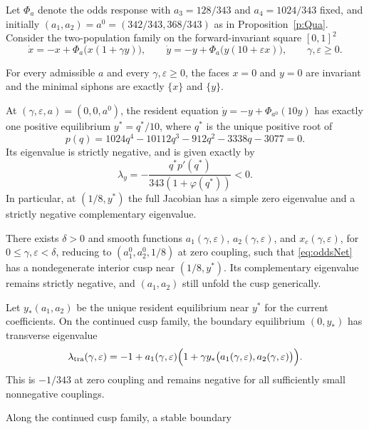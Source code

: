 Let $\Phi_a$ denote the odds response with $a_3=128/343$ and
$a_4=1024/343$ fixed, and initially
$(a_1,a_2)=a^0=(342/343,368/343)$ as in
Proposition~\ref{p:Qua}. Consider the two-population family on
the forward-invariant square $[0,1]^2$
\begin{equation}\label{eq:oddsNet}
 \dot x=-x+\Phi_a\bigl(x(1+\gamma y)\bigr),\qquad
 \dot y=-y+\Phi_a\bigl(y(10+\varepsilon x)\bigr),
 \qquad \gamma,\varepsilon\ge0.
\end{equation}
\BEN
\item For every admissible $a$ and every $\gamma,\varepsilon\ge0$,
 the faces $x=0$ and $y=0$ are invariant and the minimal siphons
 are exactly $\{x\}$ and $\{y\}$.
\item At $(\gamma,\varepsilon,a)=(0,0,a^0)$, the resident equation
 $\dot y=-y+\Phi_{a^0}(10y)$ has exactly one positive equilibrium
 $y^*=q^*/10$, where $q^*$ is the unique positive root of
\begin{equation}\label{eq:oddsResident}
 p(q)=1024q^4-10112q^3-912q^2-3338q-3077=0.
\end{equation}
 Its eigenvalue is strictly negative, and is given exactly by
 \[
 \lambda_y=-\frac{q^*p'(q^*)}{343(1+\varphi(q^*))}<0.
 \]
 In particular, at $(1/8,y^*)$ the full Jacobian has a simple
 zero eigenvalue and a strictly negative complementary eigenvalue.
\item There exists $\delta>0$ and smooth functions
 $a_1(\gamma,\varepsilon)$, $a_2(\gamma,\varepsilon)$,
 and $x_c(\gamma,\varepsilon)$, for
 $0\le\gamma,\varepsilon<\delta$, reducing to
 $(a_1^0,a_2^0,1/8)$ at zero coupling, such that
 \eqref{eq:oddsNet} has a nondegenerate interior cusp near
 $(1/8,y^*)$. Its complementary eigenvalue remains strictly
 negative, and $(a_1,a_2)$ still unfold the cusp generically.
\item Let $y_*(a_1,a_2)$ be the unique resident equilibrium
 near $y^*$ for the current coefficients. On the continued cusp
 family, the boundary equilibrium $(0,y_*)$ has transverse eigenvalue
\begin{equation}\label{eq:oddsTransEig}
 \lambda_{\mathrm{tra}}(\gamma,\varepsilon)
 =-1+a_1(\gamma,\varepsilon)
 \Bigl(1+\gamma y_*\bigl(a_1(\gamma,\varepsilon),
                             a_2(\gamma,\varepsilon)\bigr)\Bigr).
\end{equation}
 This is $-1/343$ at zero coupling and remains negative for all
 sufficiently small nonnegative couplings.
\item Along the continued cusp family, a stable boundary
